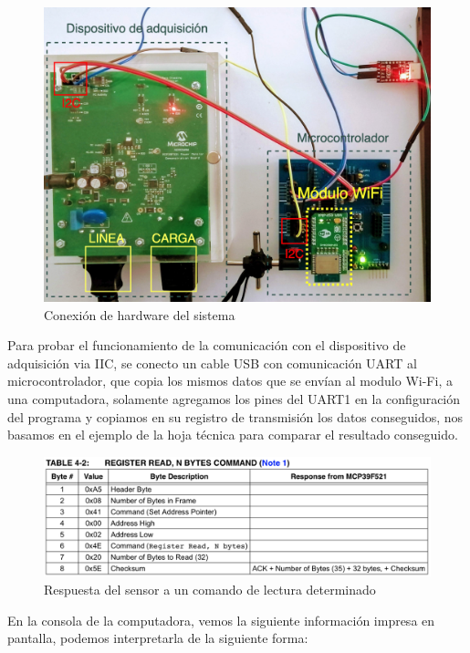 \begin{figure}[H]
	\centering
	\includegraphics[scale=.3]{Capitulo5/images/conexion_fisica.png}
	\caption{Conexión de hardware del sistema}
	\label{fig:conexion hardware}
\end{figure} 

Para probar el funcionamiento de la comunicación con el dispositivo de adquisición via IIC, se conecto un cable USB con comunicación UART al microcontrolador, que copia los mismos datos que se envían al modulo Wi-Fi, a una computadora, solamente agregamos los pines del UART1 en la configuración del programa y copiamos en su registro de transmisión los datos conseguidos, nos basamos en el ejemplo de la hoja técnica para comparar el resultado conseguido.

\begin{figure}[H]
	\centering
	\includegraphics[scale=.3]{Capitulo5/images/respuesta_sensor.png}
	\caption{Respuesta del sensor a un comando de lectura determinado}
	\label{fig:respuesta sensor}
\end{figure} 

En la consola de la computadora, vemos la siguiente información impresa en pantalla,  podemos interpretarla de la siguiente forma:

